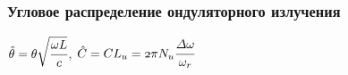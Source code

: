 \documentclass[14pt, hyperref = {colorlinks},xcolor=table ]{beamer}
\begin{document}
\small
\begin{frame}
\frametitle{Угловое распределение ондуляторного излучения}\label{t1}
\begin{figure}[h]
	\begin{minipage}[h]{0.49\linewidth}
		\vspace{-30pt}
	\end{minipage}	
	\begin{minipage}[h]{0.49\linewidth}
		\vspace{-30pt}
	\end{minipage}
\end{figure}
\hspace{-0pt}\tiny{$\hat{\theta} = \theta\sqrt{\cfrac{\omega L}{c}}$}, \tiny{$\mathnormal{\hat{C} = CL_u = 2\pi N_u\cfrac{\Delta\omega}{\omega_r}}$}
\end{frame}
\end{document}
